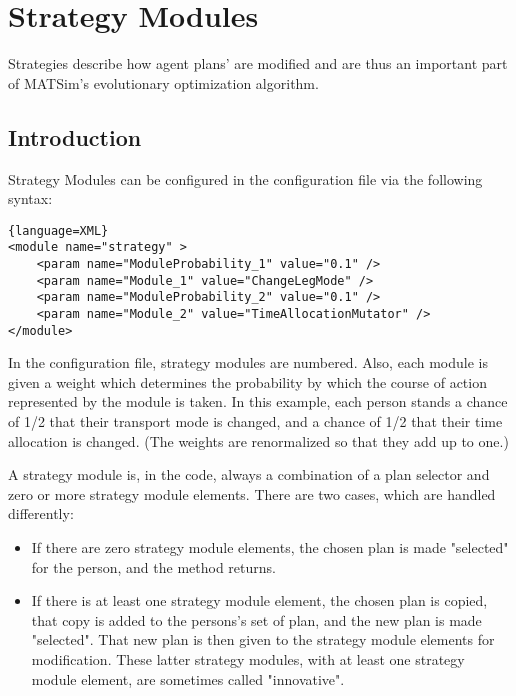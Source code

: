 \chapter{Strategy Modules}


\bigskip

\begin{chapter-intro}
Strategies describe how agent plans' are modified and are thus an important
part of MATSim's evolutionary optimization algorithm. 
\end{chapter-intro}


\section{Introduction}
\label{sec:introduction}


Strategy Modules can be configured in the configuration file via the following syntax:
\begin{lstlisting}{language=XML}
<module name="strategy" >
    <param name="ModuleProbability_1" value="0.1" />
    <param name="Module_1" value="ChangeLegMode" />
    <param name="ModuleProbability_2" value="0.1" />
    <param name="Module_2" value="TimeAllocationMutator" />
</module>
\end{lstlisting}

In the configuration file, strategy modules are numbered. Also, each module is given a weight 
which determines the probability by which the course of action represented by the module is taken. 
In this example, each person stands a chance of 1/2 that their transport mode is changed,  and a chance of 1/2 that their time allocation is changed. (The  weights are renormalized so that they add up to one.)

A strategy module is, in the code, always a combination of a plan  selector and zero or more strategy module elements. There are two cases,  which are handled differently:
\begin{itemize}
	\item If there are zero strategy module elements, the chosen plan is made "selected" for the person, and the method returns.
	\item If there is at least one strategy module element, the chosen plan is  copied, that copy is added to the persons's set of plan, and the new  plan is made "selected". That new plan is then given to the  strategy module elements for modification. These latter strategy  modules, with at least one strategy module element, are sometimes called  "innovative".
\end{itemize}

